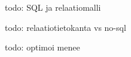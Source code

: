 \documentclass[finnish]{tktltiki2}
\theoremstyle{definition}
\theoremstyle{remark}
\begin{document}
todo: SQL ja relaatiomalli

todo: relaatiotietokanta vs no-sql

todo: optimoi menee

\cite{chaudhuri1998}



%
%
% 
%



\end{document}

